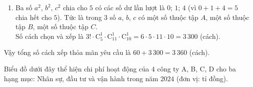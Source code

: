 \begin{ex}
{\begin{enumerate}[\it TH1:]
			Số cách chọn và xếp $3$ số từ tập $A$ vào $3$ tam giác ở góc (có phân biệt thứ tự) là $\mathrm{A}_5^3=60$ (cách).
			\item Ba số $a^2$, $b^2$, $c^2$ chia cho $5$ có các số dư lần lượt là $0$; $1$; $4$ (vì $0+1+4=5$ chia hết cho $5$). Tức là trong $3$ số $a$, $b$, $c$ có một số thuộc tập $A$, một số thuộc tập $B$, một số thuộc tập $C$. \\
			Số cách chọn và xếp là $3! \cdot \mathrm{C}_5^1 \cdot \mathrm{C}_{11}^1 \cdot \mathrm{C}_{10}^1=6 \cdot 5 \cdot 11 \cdot 10=3\,300$ (cách).
		\end{enumerate}
		Vậy tổng số cách xếp thỏa mãn yêu cầu là $60+3\,300=3\,360$ (cách).
	}
\end{ex}

\begin{ex}%
	Biểu đồ dưới đây thể hiện chi phí hoạt động của $4$ công ty A, B, C, D cho ba hạng mục: Nhân sự, đầu tư và vận hành trong năm $2024$ (đơn vị: tỉ đồng).
	\begin{center}
\end{center}
\end{ex}
